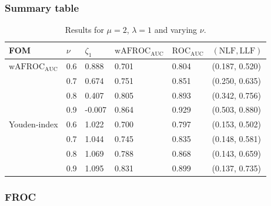 \documentclass[
]{book}
\begin{document}
\hypertarget{summary-table-2}{%
\subsubsection{Summary table}\label{summary-table-2}}

\begin{table}

\caption{\label{tab:optim-op-point-table-vary-nu}Results for $\mu = 2$, $\lambda = 1$ and varying $\nu$.}
\centering
\fontsize{10}{12}\selectfont
\begin{tabular}[t]{llllll}
\toprule
FOM & $\nu$ & $\zeta_1$ & $\text{wAFROC}_\text{AUC}$ & $\text{ROC}_\text{AUC}$ & $\left( \text{NLF}, \text{LLF}\right)$\\
\midrule
$\text{wAFROC}_\text{AUC}$ & 0.6 & 0.888 & 0.701 & 0.804 & (0.187, 0.520)\\
 & 0.7 & 0.674 & 0.751 & 0.851 & (0.250, 0.635)\\
 & 0.8 & 0.407 & 0.805 & 0.893 & (0.342, 0.756)\\
 & 0.9 & -0.007 & 0.864 & 0.929 & (0.503, 0.880)\\
Youden-index & 0.6 & 1.022 & 0.700 & 0.797 & (0.153, 0.502)\\
\addlinespace
 & 0.7 & 1.044 & 0.745 & 0.835 & (0.148, 0.581)\\
 & 0.8 & 1.069 & 0.788 & 0.868 & (0.143, 0.659)\\
 & 0.9 & 1.095 & 0.831 & 0.899 & (0.137, 0.735)\\
\bottomrule
\end{tabular}
\end{table}

\hypertarget{froc-3}{%
\subsubsection{FROC}\label{froc-3}}
\end{document}

